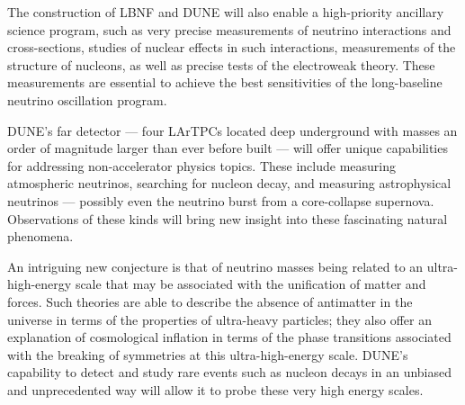 The construction of LBNF and DUNE will also enable a high-priority ancillary science program, such as 
very precise measurements of neutrino interactions and cross-sections, studies of nuclear effects in such interactions, measurements of the structure of nucleons, as well as precise tests of the electroweak theory. 
These measurements are essential to achieve the best sensitivities of the long-baseline neutrino oscillation program. %

DUNE's far detector --- four LArTPCs located deep underground with masses an order of magnitude larger than ever before built  ---  %
will offer unique capabilities for addressing %
non-accelerator physics topics. These include measuring atmospheric neutrinos, searching for nucleon decay, and measuring astrophysical neutrinos --- possibly even %
the neutrino burst %
from a core-collapse supernova. 
Observations of these kinds will bring new insight into these fascinating natural phenomena. 


An intriguing %
new conjecture is that of neutrino masses being related to an %
ultra-high-energy scale that may be associated with the unification of matter and forces. Such theories are able to describe the absence of antimatter in the universe in terms of the properties of ultra-heavy particles; they also %
offer an explanation %
of cosmological inflation in terms of the phase transitions associated with the breaking of symmetries at this ultra-high-energy scale. DUNE's capability to detect and study rare events such as nucleon decays in an unbiased and unprecedented way will allow it to probe these very high energy scales. 


